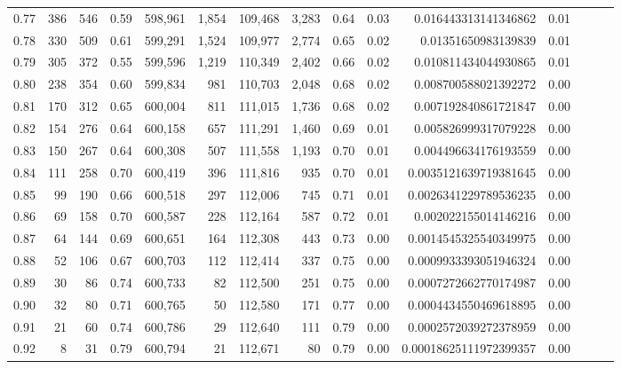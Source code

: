 \begin{tabular}{rrrrrrrrrrrrrrr}
0.77 &     386 &    546 &  0.59 &  598,961 &    1,854 &  109,468 &    3,283 &  0.64 &  0.03 &    0.016443313141346862 &      0.01 \\
0.78 &     330 &    509 &  0.61 &  599,291 &    1,524 &  109,977 &    2,774 &  0.65 &  0.02 &     0.01351650983139839 &      0.01 \\
0.79 &     305 &    372 &  0.55 &  599,596 &    1,219 &  110,349 &    2,402 &  0.66 &  0.02 &    0.010811434044930865 &      0.01 \\
0.80 &     238 &    354 &  0.60 &  599,834 &      981 &  110,703 &    2,048 &  0.68 &  0.02 &    0.008700588021392272 &      0.00 \\
0.81 &     170 &    312 &  0.65 &  600,004 &      811 &  111,015 &    1,736 &  0.68 &  0.02 &    0.007192840861721847 &      0.00 \\
0.82 &     154 &    276 &  0.64 &  600,158 &      657 &  111,291 &    1,460 &  0.69 &  0.01 &    0.005826999317079228 &      0.00 \\
0.83 &     150 &    267 &  0.64 &  600,308 &      507 &  111,558 &    1,193 &  0.70 &  0.01 &    0.004496634176193559 &      0.00 \\
0.84 &     111 &    258 &  0.70 &  600,419 &      396 &  111,816 &      935 &  0.70 &  0.01 &   0.0035121639719381645 &      0.00 \\
0.85 &      99 &    190 &  0.66 &  600,518 &      297 &  112,006 &      745 &  0.71 &  0.01 &   0.0026341229789536235 &      0.00 \\
0.86 &      69 &    158 &  0.70 &  600,587 &      228 &  112,164 &      587 &  0.72 &  0.01 &    0.002022155014146216 &      0.00 \\
0.87 &      64 &    144 &  0.69 &  600,651 &      164 &  112,308 &      443 &  0.73 &  0.00 &   0.0014545325540349975 &      0.00 \\
0.88 &      52 &    106 &  0.67 &  600,703 &      112 &  112,414 &      337 &  0.75 &  0.00 &   0.0009933393051946324 &      0.00 \\
0.89 &      30 &     86 &  0.74 &  600,733 &       82 &  112,500 &      251 &  0.75 &  0.00 &   0.0007272662770174987 &      0.00 \\
0.90 &      32 &     80 &  0.71 &  600,765 &       50 &  112,580 &      171 &  0.77 &  0.00 &   0.0004434550469618895 &      0.00 \\
0.91 &      21 &     60 &  0.74 &  600,786 &       29 &  112,640 &      111 &  0.79 &  0.00 &   0.0002572039272378959 &      0.00 \\
0.92 &       8 &     31 &  0.79 &  600,794 &       21 &  112,671 &       80 &  0.79 &  0.00 &  0.00018625111972399357 &      0.00 \\

\end{tabular}

